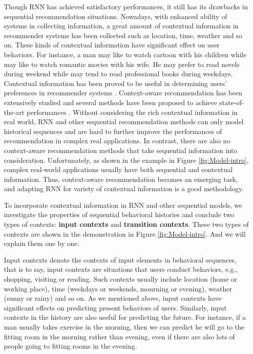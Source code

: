 \documentclass[conference]{IEEEtran}
\begin{document}
Though RNN has achieved satisfactory performances, it still has its drawbacks in sequential recommendation situations. Nowadays, with enhanced ability of systems in collecting information, a great amount of contextual information in recommender systems has been collected such as location, time, weather and so on. These kinds of contextual information have significant effect on user behaviors. For instance, a man may like to watch cartoon with his children while may like to watch romantic movies with his wife. He may prefer to read novels during weekend while may tend to read professional books during weekdays. Contextual information has been proved to be useful in determining users' preferences in recommender systems \cite{palmisano2008using,adomavicius2011context}. Context-aware recommendation has been extensively studied and several methods have been proposed to achieve state-of-the-art performances \cite{rendle2011fast,shi2012tfmap,jamali2013heteromf,shi2014cars,liu2015cot}. Without considering the rich contextual information in real world, RNN and other sequential recommendation methods can only model historical sequences and are hard to further improve the performances of recommendation in complex real applications. In contrast, there are also no context-aware recommendation methods that take sequential information into consideration. Unfortunately, as shown in the example in Figure \ref{fig:Model-intro}, complex real-world applications usually have both sequential and contextual information. Thus, context-aware recommendation becomes an emerging task, and adapting RNN for variety of contextual information is a good methodology.

To incorporate contextual information in RNN and other sequential models, we investigate the properties of sequential behavioral histories and conclude two types of contexts: \textbf{input contexts} and \textbf{transition contexts}. These two types of contexts are shown in the demonstration in Figure \ref{fig:Model-intro}. And we will explain them one by one.

Input contexts denote the contexts of input elements in behavioral sequences, that is to say, input contexts are situations that users conduct behaviors, e.g., shopping, visiting or reading. Such contexts usually include location (home or working place), time (weekdays or weekends, mourning or evening), weather (sunny or rainy) and so on. As we mentioned above, input contexts have significant effects on predicting present behaviors of users. Similarly, input contexts in the history are also useful for predicting the future. For instance, if a man usually takes exercise in the morning, then we can predict he will go to the fitting room in the morning rather than evening, even if there are also lots of people going to fitting rooms in the evening.
\end{document}
